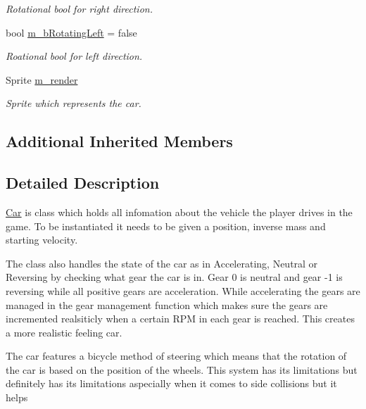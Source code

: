 \begin{DoxyCompactItemize}
\begin{DoxyCompactList}\small\item\em Rotational bool for right direction. \end{DoxyCompactList}\item 
\hypertarget{class_car_ab95acc2df88b466d369bed8b15527d4b}{}bool \hyperlink{class_car_ab95acc2df88b466d369bed8b15527d4b}{m\+\_\+b\+Rotating\+Left} = false\label{class_car_ab95acc2df88b466d369bed8b15527d4b}

\begin{DoxyCompactList}\small\item\em Roational bool for left direction. \end{DoxyCompactList}\item 
\hypertarget{class_car_aeaaafebefc59dfd9d3976b5bf3ac37e2}{}Sprite \hyperlink{class_car_aeaaafebefc59dfd9d3976b5bf3ac37e2}{m\+\_\+render}\label{class_car_aeaaafebefc59dfd9d3976b5bf3ac37e2}

\begin{DoxyCompactList}\small\item\em Sprite which represents the car. \end{DoxyCompactList}\end{DoxyCompactItemize}
\subsection*{Additional Inherited Members}


\subsection{Detailed Description}
\hyperlink{class_car}{Car} is class which holds all infomation about the vehicle the player drives in the game. To be instantiated it needs to be given a position, inverse mass and starting velocity.

The class also handles the state of the car as in Accelerating, Neutral or Reversing by checking what gear the car is in. Gear 0 is neutral and gear -\/1 is reversing while all positive gears are acceleration. While accelerating the gears are managed in the gear management function which makes sure the gears are incremented realsiticly when a certain R\+P\+M in each gear is reached. This creates a more realistic feeling car.

The car features a bicycle method of steering which means that the rotation of the car is based on the position of the wheels. This system has its limitations but definitely has its limitations aspecially when it comes to side collisions but it helps

